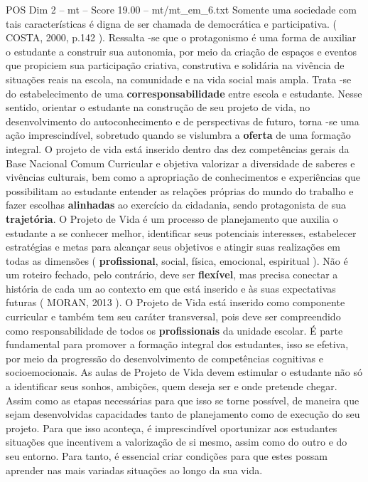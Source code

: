 \begin{textsample}{POS Dim 2 – mt – Score 19.00 – mt/mt\_em\_6.txt}
Somente uma sociedade com tais características é digna de ser chamada de democrática e participativa. ( COSTA, 2000, p.142 ).
Ressalta -se que o protagonismo é uma forma de auxiliar o estudante a construir sua autonomia, por meio da criação de espaços e eventos que propiciem sua participação criativa, construtiva e solidária na vivência de situações reais na escola, na comunidade e na vida social mais ampla.
Trata -se do estabelecimento de uma \textbf{corresponsabilidade} entre escola e estudante.
Nesse sentido, orientar o estudante na construção de seu projeto de vida, no desenvolvimento do autoconhecimento e de perspectivas de futuro, torna -se uma ação imprescindível, sobretudo quando se vislumbra a \textbf{oferta} de uma formação integral.
O projeto de vida está inserido dentro das dez competências gerais da Base Nacional Comum Curricular e objetiva valorizar a diversidade de saberes e vivências culturais, bem como a apropriação de conhecimentos e experiências que possibilitam ao estudante entender as relações próprias do mundo do trabalho e fazer escolhas \textbf{alinhadas} ao exercício da cidadania, sendo protagonista de sua \textbf{trajetória}.
O Projeto de Vida é um processo de planejamento que auxilia o estudante a se conhecer melhor, identificar seus potenciais interesses, estabelecer estratégias e metas para alcançar seus objetivos e atingir suas realizações em todas as dimensões ( \textbf{profissional}, social, física, emocional, espiritual ).
Não é um roteiro fechado, pelo contrário, deve ser \textbf{flexível}, mas precisa conectar a história de cada um ao contexto em que está inserido e às suas expectativas futuras ( MORAN, 2013 ).
O Projeto de Vida está inserido como componente curricular e também tem seu caráter transversal, pois deve ser compreendido como responsabilidade de todos os \textbf{profissionais} da unidade escolar.
É parte fundamental para promover a formação integral dos estudantes, isso se efetiva, por meio da progressão do desenvolvimento de competências cognitivas e socioemocionais.
As aulas de Projeto de Vida devem estimular o estudante não só a identificar seus sonhos, ambições, quem deseja ser e onde pretende chegar.
Assim como as etapas necessárias para que isso se torne possível, de maneira que sejam desenvolvidas capacidades tanto de planejamento como de execução do seu projeto.
Para que isso aconteça, é imprescindível oportunizar aos estudantes situações que incentivem a valorização de si mesmo, assim como do outro e do seu entorno.
Para tanto, é essencial criar condições para que estes possam aprender nas mais variadas situações ao longo da sua vida.

\end{textsample}
